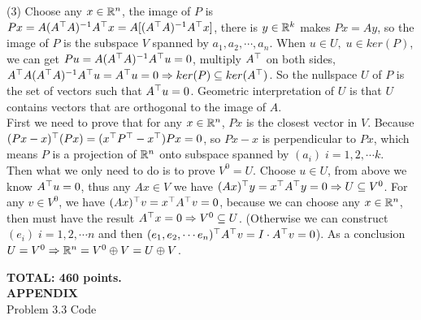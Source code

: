 \documentclass[12pt]{article}
\begin{document}
\medskip
(3) Choose any $x \in \mathbb{R}^n$, the image of $P$ is $Px = A(A^{\top}A)^{-1} A^{\top} x = A [(A^{\top}A)^{-1} A^{\top} x]$, there is $y \in \mathbb{R}^k$ makes $Px = Ay$, so the image of $P$ is the subspace $V$ spanned by $a_1, a_2, \cdots, a_n$.
When $u \in U ,\; u \in ker(P)$, we can get $Pu = A(A^{\top}A)^{-1} A^{\top} u = 0$, multiply $A^{\top}$ on both sides, $A^{\top} A (A^{\top}A)^{-1} A^{\top} u =  A^{\top} u = 0 \Rightarrow ker(P) \subseteq ker(A^{\top})$. So the nullspace $U$ of $P$ is the set of vectors such that $A^{\top} u = 0$. Geometric interpretation of $U$ is that $U$ contains vectors that are orthogonal to the image of $A$.\\
\medskip
First we need to prove that for any $x \in \mathbb{R}^n$, $Px$ is the closest vector in $V$. Because $(Px - x)^{\top} (Px) = (x^{\top} P^{\top} - x^{\top})Px = 0$, so $Px - x$ is perpendicular to $Px$, which means $P$ is a projection of $\mathbb{R}^n$ onto subspace spanned by $(a_i)\; i = 1,2,\cdots k$. \\
Then what we only need to do is to prove $V^0 = U$. Choose $u \in U$, from above we know $A^{\top} u = 0$, thus any $Ax \in V$ we have $(Ax)^{\top} y = x^{\top} A^{\top} y = 0 \Rightarrow U \subseteq V^0$. For any $v \in V^0$, we have $(A x )^{\top} v = x^{\top} A^{\top} v = 0$, because we can choose any $x \in \mathbb{R}^n$, then must have the result $A^{\top}x = 0 \Rightarrow V^0 \subseteq U$. (Otherwise we can construct $(e_i) \; i = 1,2,\cdots n$ and then $(e_1, e_2, \cdots e_n)^{\top} A^{\top} v  = I \cdot A^{\top} v = 0$). As a conclusion $U = V^0 \Rightarrow \mathbb{R}^n =  V^0 \oplus V = U \oplus V$.

\vspace{0.5cm}\noindent
{\bf TOTAL:  460 points.} \\

{\bf APPENDIX} \\

Problem 3.3 Code

\end{document}

